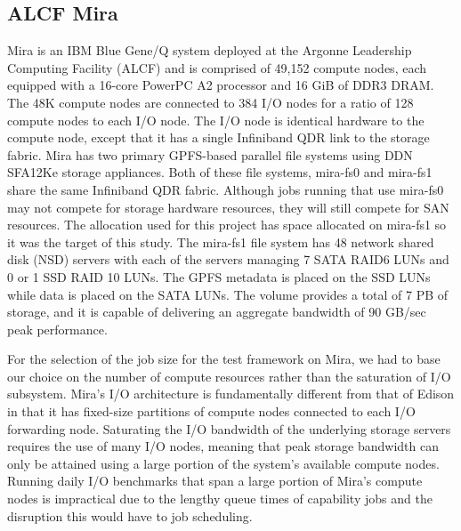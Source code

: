 \subsection{ALCF Mira} \label{sec:platforms/mira}

 Mira is an IBM Blue Gene/Q system deployed at the Argonne Leadership Computing Facility (ALCF) and is comprised of 49,152 compute nodes, each equipped with a 16-core PowerPC A2 processor and 16 GiB of DDR3 DRAM. The 48K 
compute nodes are connected to 384 I/O nodes for a ratio of 128 compute nodes
to each I/O node. The I/O node is identical hardware to the compute node,
except that it has a single Infiniband QDR link to the storage fabric.
Mira has two primary GPFS-based parallel file systems using DDN SFA12Ke storage appliances.
Both of these file systems, mira-fs0 and mira-fs1 share the same
Infiniband QDR fabric. Although jobs running that use mira-fs0 may not compete
for storage hardware resources, they will still compete for SAN resources.
The allocation used for this project has space allocated on mira-fs1 so it 
was the target of this study.
The mira-fs1 file system has 48 network shared disk (NSD) servers with each of the
servers managing 7 SATA RAID6 LUNs and 0 or 1 SSD RAID 10 LUNs. The GPFS metadata
is placed on the SSD LUNs while data is placed on the SATA LUNs. The volume provides a total of 7 PB of storage, and it is capable of delivering an aggregate bandwidth of 90 GB/sec peak performance.


For the selection of the job size for the test framework on Mira, we had to
base our choice on the number of compute resources rather than the saturation of
I/O subsystem.
Mira's I/O architecture is fundamentally different from that of Edison in that it has fixed-size partitions of compute nodes connected to each I/O forwarding node.
Saturating the I/O bandwidth of the underlying storage servers requires the
use of many I/O nodes, meaning that peak storage bandwidth can only be
attained using a large portion of the system's available compute nodes.
Running daily I/O benchmarks that span a large portion of Mira's compute
nodes is impractical due to the lengthy queue times of capability jobs and
the disruption this would have to job scheduling.

